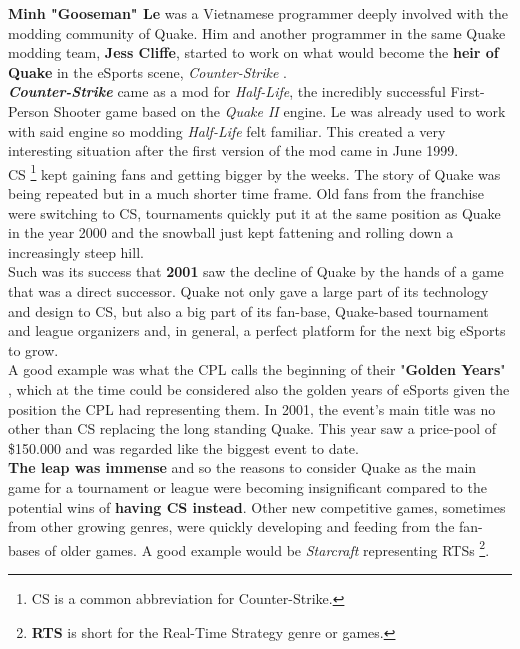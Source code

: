 \textbf{Minh "Gooseman" Le} \citep{gooseman} was a Vietnamese programmer deeply involved with the modding community of Quake. Him and another programmer in the same Quake modding team, \textbf{Jess Cliffe}, started to work on what would become the \textbf{heir of Quake} in the eSports scene, \textit{Counter-Strike} \citep{game:cs}.\\

\textit{\textbf{Counter-Strike}} came as a mod for \textit{Half-Life}, the incredibly successful First-Person Shooter game based on the \textit{Quake II} engine. Le was already used to work with said engine so modding \textit{Half-Life} felt familiar. This created a very interesting situation after the first version of the mod came in June 1999.\\

CS \footnote{CS is a common abbreviation for Counter-Strike.} kept gaining fans and getting bigger by the weeks. The story of Quake was being repeated but in a much shorter time frame. Old fans from the franchise were switching to CS, tournaments quickly put it at the same position as Quake in the year 2000 and the snowball just kept fattening and rolling down a increasingly steep hill.\\

Such was its success that \textbf{2001} saw the decline of Quake by the hands of a game that was a direct successor. Quake not only gave a large part of its technology and design to CS, but also a big part of its fan-base, Quake-based tournament and league organizers and, in general, a perfect platform for the next big eSports to grow.\\

A good example was what the CPL calls the beginning of their "\textbf{Golden Years}" \citep{web:cpl}, which at the time could be considered also the golden years of eSports given the position the CPL had representing them. In 2001, the event's main title was no other than CS replacing the long standing Quake. This year saw a price-pool of \$150.000 and was regarded like the biggest event to date.\\

\textbf{The leap was immense} and so the reasons to consider Quake as the main game for a tournament or league were becoming insignificant compared to the potential wins of \textbf{having CS instead}. Other new competitive games, sometimes from other growing genres, were quickly developing and feeding from the fan-bases of older games. A good example would be \textit{Starcraft} \citep{game:starcraft} representing RTSs \footnote{\textbf{RTS} is short for the Real-Time Strategy genre or games.}.\\

